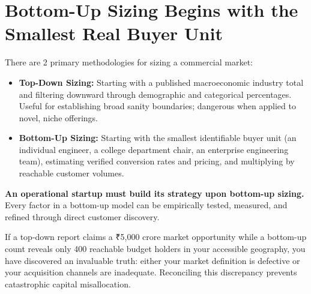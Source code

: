 \section{Bottom-Up Sizing Begins with the Smallest Real Buyer Unit}

There are 2 primary methodologies for sizing a commercial market:
\begin{itemize}[leftmargin=12pt,itemsep=2pt,topsep=1pt]
  \item \textbf{Top-Down Sizing:} Starting with a published macroeconomic industry total and filtering downward through demographic and categorical percentages. Useful for establishing broad sanity boundaries; dangerous when applied to novel, niche offerings.
  \item \textbf{Bottom-Up Sizing:} Starting with the smallest identifiable buyer unit (an individual engineer, a college department chair, an enterprise engineering team), estimating verified conversion rates and pricing, and multiplying by reachable customer volumes.
\end{itemize}

\textbf{An operational startup must build its strategy upon bottom-up sizing.} Every factor in a bottom-up model can be empirically tested, measured, and refined through direct customer discovery.

If a top-down report claims a ₹5,000 crore market opportunity while a bottom-up count reveals only 400 reachable budget holders in your accessible geography, you have discovered an invaluable truth: either your market definition is defective or your acquisition channels are inadequate. Reconciling this discrepancy prevents catastrophic capital misallocation.
